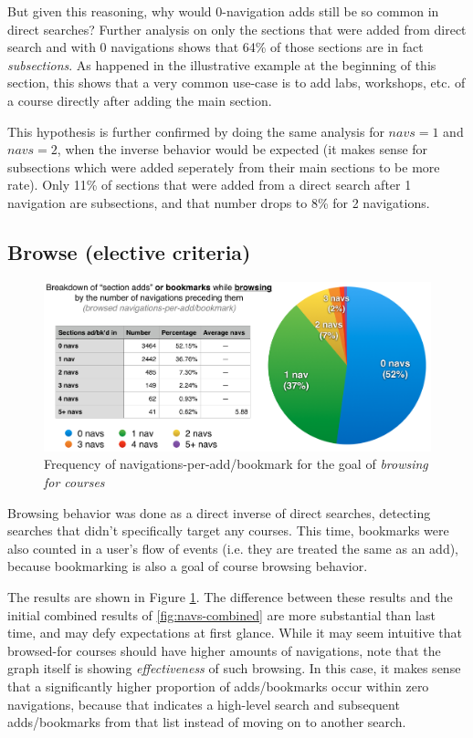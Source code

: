   But given this reasoning, why would 0-navigation adds still be so common in direct searches? Further analysis on only the sections that were added from direct search and with 0 navigations shows that 64\% of those sections are in fact \emph{subsections}. As happened in the illustrative example at the beginning of this section, this shows that a very common use-case is to add labs, workshops, etc. of a course directly after adding the main section.

  This hypothesis is further confirmed by doing the same analysis for ${navs}=1$ and ${navs}=2$, when the inverse behavior would be expected (it makes sense for subsections which were added seperately from their main sections to be more rate). Only 11\% of sections that were added from a direct search after 1 navigation are subsections, and that number drops to 8\% for 2 navigations.

\subsection{Browse (elective criteria)}

  \begin{figure}
    \centering
    \includegraphics[width=1.0\textwidth]{images/graph/browsed_navs}

    \caption{Frequency of navigations-per-add/bookmark for the goal of \emph{browsing for courses}}
    \label{fig:navs-browse}
  \end{figure}

  Browsing behavior was done as a direct inverse of direct searches, detecting searches that didn't specifically target any courses. This time, bookmarks were also counted in a user's flow of events (i.e. they are treated the same as an add), because bookmarking is also a goal of course browsing behavior.

  The results are shown in Figure \ref{fig:navs-browse}. The difference between these results and the initial combined results of \ref{fig:navs-combined} are more substantial than last time, and may defy expectations at first glance. While it may seem intuitive that browsed-for courses should have higher amounts of navigations, note that the graph itself is showing \emph{effectiveness} of such browsing. In this case, it makes sense that a significantly higher proportion of adds/bookmarks occur within zero navigations, because that indicates a high-level search and subsequent adds/bookmarks from that list instead of moving on to another search.

